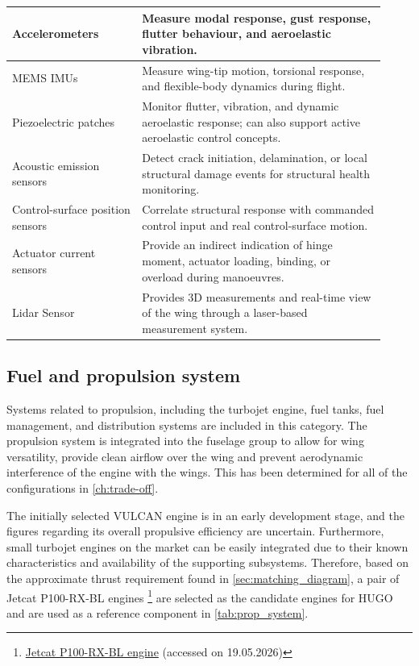 \begin{longtable}{|p{0.32\linewidth}|p{0.60\linewidth}|}
Accelerometers 
& Measure modal response, gust response, flutter behaviour, and aeroelastic vibration. \\
\hline

MEMS IMUs 
& Measure wing-tip motion, torsional response, and flexible-body dynamics during flight. \\
\hline

Piezoelectric patches 
& Monitor flutter, vibration, and dynamic aeroelastic response; can also support active aeroelastic control concepts. \\
\hline

Acoustic emission sensors 
& Detect crack initiation, delamination, or local structural damage events for structural health monitoring. \\
\hline

Control-surface position sensors 
& Correlate structural response with commanded control input and real control-surface motion. \\
\hline

Actuator current sensors 
& Provide an indirect indication of hinge moment, actuator loading, binding, or overload during manoeuvres. \\
\hline

Lidar Sensor
& Provides 3D measurements and real-time view of the wing through a laser-based measurement system. \\
\hline

\end{longtable}



\subsection{Fuel and propulsion system}
\label{subsec:fuel_systems}
Systems related to propulsion, including the turbojet engine, fuel tanks, fuel management, and distribution systems are included in this category. The propulsion system is integrated into the fuselage group to allow for wing versatility, provide clean airflow over the wing and prevent aerodynamic interference of the engine with the wings. This has been determined for all of the configurations in \autoref{ch:trade-off}.

The initially selected VULCAN engine is in an early development stage, and the figures regarding its overall propulsive efficiency are uncertain. Furthermore, small turbojet engines on the market can be easily integrated due to their known characteristics and availability of the supporting subsystems. Therefore, based on the approximate thrust requirement found in \autoref{sec:matching_diagram}, a pair of Jetcat P100-RX-BL engines \footnote{\href{https://www.jetcat.de/de/productdetails/produkte/jetcat/produkte/RC\%20ENGINES/Engines/p100_rx-bl}{Jetcat P100-RX-BL engine} (accessed on 19.05.2026)} are selected as the candidate engines for HUGO and are used as a reference component in \autoref{tab:prop_system}.


